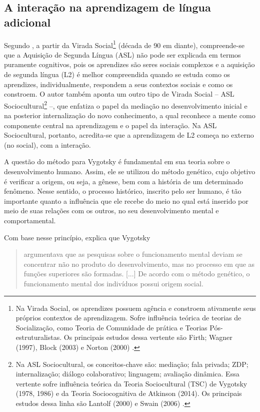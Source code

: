 \documentclass{textolivre}
\begin{document}
\subsection{A interação na aprendizagem de língua adicional}
Segundo \textcite{ellis2020}, a partir da Virada Social\footnote{Na Virada Social, os aprendizes possuem agência e constroem ativamente seus próprios contextos de aprendizagem. Sofre influência teórica de teorias de Socialização, como Teoria de Comunidade de prática e Teorias Pós-estruturalistas. Os principais estudos dessa vertente são Firth; Wagner (1997), Block (2003) e Norton (2000) \cite{ellis2020}.} (década de 90 em diante), compreende-se que a Aquisição de Segunda Língua (ASL) não pode ser explicada em termos puramente cognitivos, pois os aprendizes são seres sociais complexos e a aquisição de segunda língua (L2) é melhor compreendida quando se estuda como os aprendizes, individualmente, respondem a seus contextos sociais e como os constroem. O autor também aponta um outro tipo de Virada Social – ASL Sociocultural\footnote{Na ASL Sociocultural, os conceitos-chave são: mediação; fala privada; ZDP; internalização; diálogo colaborativo; linguagem; avaliação dinâmica. Essa vertente sofre influência teórica da Teoria Sociocultural (TSC) de Vygotsky (1978, 1986) e da Teoria Sociocognitiva de Atkinson (2014). Os principais estudos dessa linha são Lantolf (2000) e Swain (2006) \cite{ellis2020}.} –, que enfatiza o papel da mediação no desenvolvimento inicial e na posterior internalização do novo conhecimento, a qual reconhece a mente como componente central na aprendizagem e o papel da interação. Na ASL Sociocultural, portanto, acredita-se que a aprendizagem de L2 começa no externo (no social), com a interação.

A questão do método para Vygotsky é fundamental em sua teoria sobre o desenvolvimento humano. Assim, ele se utilizou do método genético, cujo objetivo é verificar a origem, ou seja, a gênese, bem com a história de um determinado fenômeno. Nesse sentido, o processo histórico, inscrito pelo ser humano, é tão importante quanto a influência que ele recebe do meio no qual está inserido por meio de suas relações com os outros, no seu desenvolvimento mental e comportamental.

Com base nesse princípio, \textcite[p. 14]{figueiredo2019} explica que Vygotsky

\begin{quote}
argumentava que as pesquisas sobre o funcionamento mental deviam se concentrar não no produto do desenvolvimento, mas no processo em que as funções superiores são formadas. [...] De acordo com o método genético, o funcionamento mental dos indivíduos possui origem social.
\end{quote}
\end{document}
